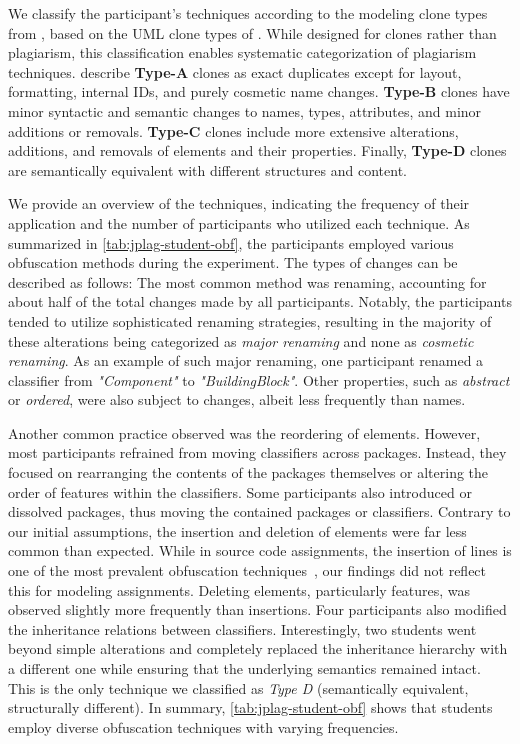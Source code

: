 We classify the participant's techniques according to the modeling clone types from \citet{Babur2019}, based on the \ac{UML} clone types of \cite{Stoerrle2015}.
While designed for clones rather than plagiarism, this classification enables systematic categorization of plagiarism techniques.
\citet{Babur2019} describe \textbf{Type-A} clones as exact duplicates except for layout, formatting, internal IDs, and purely cosmetic name changes.
\textbf{Type-B} clones have minor syntactic and semantic changes to names, types, attributes, and minor additions or removals.
\textbf{Type-C} clones include more extensive alterations, additions, and removals of elements and their properties.
Finally, \textbf{Type-D} clones are semantically equivalent with different structures and content.

We provide an overview of the techniques, indicating the frequency of their application and the number of participants who utilized each technique.
%
As summarized in \autoref{tab:jplag-student-obf}, the participants employed various obfuscation methods during the experiment. The types of changes can be described as follows:
The most common method was renaming, accounting for about half of the total changes made by all participants. Notably, the participants tended to utilize sophisticated renaming strategies, resulting in the majority of these alterations being categorized as \textit{major renaming} and none as \textit{cosmetic renaming}. 
As an example of such major renaming, one participant renamed a classifier from \textit{"Component"} to \textit{"BuildingBlock"}.
%
Other properties, such as \textit{abstract} or \textit{ordered}, were also subject to changes, albeit less frequently than names.

Another common practice observed was the reordering of elements. However, most participants refrained from moving classifiers across packages. Instead, they focused on rearranging the contents of the packages themselves or altering the order of features within the classifiers. Some participants also introduced or dissolved packages, thus moving the contained packages or classifiers.
%
Contrary to our initial assumptions, the insertion and deletion of elements were far less common than expected. While in source code assignments, the insertion of lines is one of the most prevalent obfuscation techniques~\cite{Novak2019}, our findings did not reflect this for modeling assignments. Deleting elements, particularly features, was observed slightly more frequently than insertions.
%
Four participants also modified the inheritance relations between classifiers. Interestingly, two students went beyond simple alterations and completely replaced the inheritance hierarchy with a different one while ensuring that the underlying semantics remained intact. This is the only technique we classified as \textit{Type D} (semantically equivalent, structurally different).
%
In summary, \autoref{tab:jplag-student-obf} shows that students employ diverse obfuscation techniques with varying frequencies.


